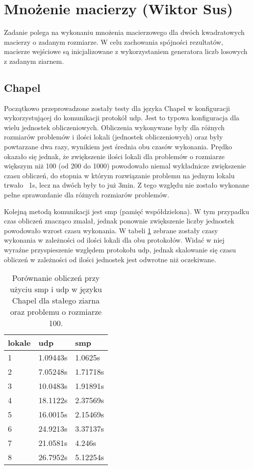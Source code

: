 \section{Mnożenie macierzy (Wiktor Sus)}
    Zadanie polega na wykonaniu mnożenia macierzowego dla dwóch kwadratowych macierzy o zadanym rozmiarze.
    W celu zachowania spójności rezultatów, macierze wejściowe są inicjalizowane z wykorzystaniem generatora liczb losowych z zadanym ziarnem.
    
    \subsection{Chapel}
    Początkowo przeprowadzone zostały testy dla języka Chapel w konfiguracji wykorzystującej do komunikacji protokół udp.
    Jest to typowa konfiguracja dla wielu jednostek obliczeniowych.
    Obliczenia wykonywane były dla różnych rozmiarów problemów i ilości lokali (jednostek obliczeniowych) oraz były powtarzane dwa razy, wynikiem jest średnia obu czasów wykonania.
    Prędko okazało się jednak, że zwiększenie ilości lokali dla problemów o rozmiarze większym niż 100 (od 200 do 1000) powodowało niemal wykładnicze zwiększenie czasu obliczeń, do stopnia w którym rozwiązanie problemu na jednym lokalu trwało ~1s, lecz na dwóch były to już 3min.
    Z tego względu nie zostało wykonane pełne sprawozdanie dla różnych rozmiarów problemów.
    
    Kolejną metodą komunikacji jest smp (pamięć współdzielona).
    W tym przypadku czas obliczeń znacząco zmalał, jednak ponownie zwiększenie liczby jednostek powodowało wzrost czasu wykonania.
    W tabeli \ref{tab:matrixmulchapelcomm} zebrane zostały czasy wykonania w zależności od ilości lokali dla obu protokołów.
    Widać w niej wyraźne przyspieszenie względem protokołu udp, jednak skalowanie się czasu obliczeń w zależności od ilości jednostek jest odwrotne niż oczekiwane.
    
    \begin{table}[]
    \centering
    \begin{tabular}{l|l|l}
    \textbf{lokale} & \textbf{udp} & \textbf{smp} \\ \hline
    1                & 1.09443s     & 1.0625s      \\
    2                & 7.05248s     & 1.71718s     \\
    3                & 10.0483s     & 1.91891s     \\
    4                & 18.1122s     & 2.37569s     \\
    5                & 16.0015s     & 2.15469s     \\
    6                & 24.9213s     & 3.37137s     \\
    7                & 21.0581s     & 4.246s       \\
    8                & 26.7952s     & 5.12254s    
    \end{tabular}
    \caption{Porównanie obliczeń przy użyciu smp i udp w języku Chapel dla stałego ziarna oraz problemu o rozmiarze 100.}
    \label{tab:matrixmulchapelcomm}
    \end{table}
    
